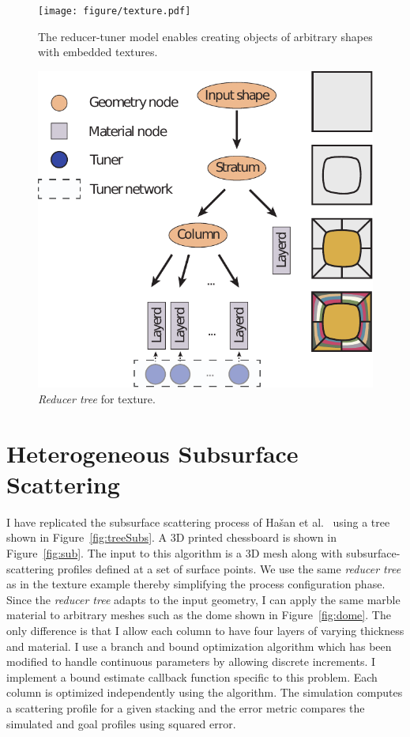 \begin{figure}[t]
\centering
\texttt{[image: figure/texture.pdf]}
\caption {The reducer-tuner model enables creating objects of arbitrary shapes with embedded textures.}
\label{fig:textured}
\end{figure}

\begin{figure}[t]
\centering
\includegraphics*[width = 0.5\linewidth]{figure/treeTexture.pdf}
\caption{\emph{Reducer tree} for texture.}
\label{fig:treeTexture}
\end{figure}

\section{Heterogeneous Subsurface Scattering}
I have replicated the subsurface scattering process of Ha\v{s}an et al.~ using a tree
shown in Figure~\ref{fig:treeSubs}. A 3D printed chessboard is shown in Figure~\ref{fig:sub}.
The input to this algorithm is a 3D mesh along with subsurface-scattering profiles defined
at a set of surface points.
We use the same \emph{reducer tree} as in the texture example thereby simplifying the process configuration phase.
Since the \emph{reducer tree} adapts to the input geometry, I can apply the same marble material to arbitrary
meshes such as the dome shown in Figure~\ref{fig:dome}.
The only difference is that I allow each column to have four layers of varying thickness and material.
I use a branch and bound optimization algorithm which has been modified to handle continuous parameters by allowing discrete increments.
I implement a bound estimate callback function specific to this problem.
Each column is optimized independently using the algorithm. 
The simulation computes a scattering profile for a given stacking
and the error metric compares the simulated and goal profiles using squared error.

